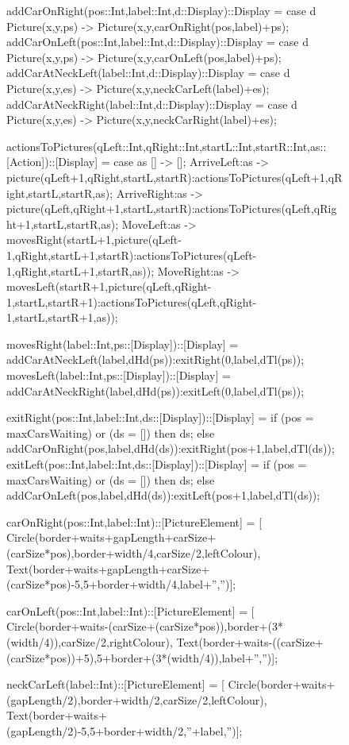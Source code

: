 \documentclass[5p,times]{elsarticle}
\begin{document}
\begin{figure}
\begin{FigESL}
addCarOnRight(pos::Int,label::Int,d::Display)::Display  = case d { Picture(x,y,ps) -> Picture(x,y,carOnRight(pos,label)+ps); }
addCarOnLeft(pos::Int,label::Int,d::Display)::Display   = case d { Picture(x,y,ps) -> Picture(x,y,carOnLeft(pos,label)+ps); }
addCarAtNeckLeft(label::Int,d::Display)::Display       = case d { Picture(x,y,es) -> Picture(x,y,neckCarLeft(label)+es); }
addCarAtNeckRight(label::Int,d::Display)::Display      = case d { Picture(x,y,es) -> Picture(x,y,neckCarRight(label)+es); }

actionsToPictures(qLeft::Int,qRight::Int,startL::Int,startR::Int,as::[Action])::[Display] =
  case as {
    [] -> [];
    ArriveLeft:as -> picture(qLeft+1,qRight,startL,startR):actionsToPictures(qLeft+1,qRight,startL,startR,as);
    ArriveRight:as -> picture(qLeft,qRight+1,startL,startR):actionsToPictures(qLeft,qRight+1,startL,startR,as);
    MoveLeft:as -> movesRight(startL+1,picture(qLeft-1,qRight,startL+1,startR):actionsToPictures(qLeft-1,qRight,startL+1,startR,as));
    MoveRight:as ->  movesLeft(startR+1,picture(qLeft,qRight-1,startL,startR+1):actionsToPictures(qLeft,qRight-1,startL,startR+1,as));
  }
  
movesRight(label::Int,ps::[Display])::[Display] = addCarAtNeckLeft(label,dHd(ps)):exitRight(0,label,dTl(ps));
movesLeft(label::Int,ps::[Display])::[Display]  = addCarAtNeckRight(label,dHd(ps)):exitLeft(0,label,dTl(ps));
  
exitRight(pos::Int,label::Int,ds::[Display])::[Display] =
  if (pos = maxCarsWaiting) or (ds = []) then ds; else addCarOnRight(pos,label,dHd(ds)):exitRight(pos+1,label,dTl(ds));
exitLeft(pos::Int,label::Int,ds::[Display])::[Display] =
  if (pos = maxCarsWaiting) or (ds = []) then ds; else addCarOnLeft(pos,label,dHd(ds)):exitLeft(pos+1,label,dTl(ds));
  
carOnRight(pos::Int,label::Int)::[PictureElement] = [
  Circle(border+waits+gapLength+carSize+(carSize*pos),border+width/4,carSize/2,leftColour),
  Text(border+waits+gapLength+carSize+(carSize*pos)-5,5+border+width/4,label+'','')]; 
  
carOnLeft(pos::Int,label::Int)::[PictureElement] = [
  Circle(border+waits-(carSize+(carSize*pos)),border+(3*(width/4)),carSize/2,rightColour),
  Text(border+waits-((carSize+(carSize*pos))+5),5+border+(3*(width/4)),label+'','')];
  
neckCarLeft(label::Int)::[PictureElement] = [
  Circle(border+waits+(gapLength/2),border+width/2,carSize/2,leftColour),
  Text(border+waits+(gapLength/2)-5,5+border+width/2,''+label,'')];
  

\end{FigESL}
\end{figure}
\end{document}
